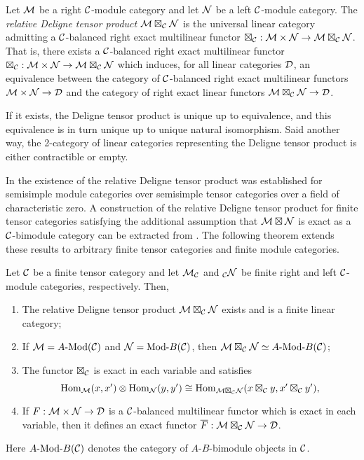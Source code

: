 \documentclass{amsart}
\begin{document}
\begin{definition}
	Let $\mathcal M$ be a right $\mathcal C$-module category and let $\mathcal N$ be a left $\mathcal C$-module category. The {\em relative Deligne tensor product $\mathcal M \boxtimes_{\mathcal C} \mathcal N$} is the universal linear category admitting a $\mathcal C$-balanced right exact multilinear functor $\boxtimes_{\mathcal C}: \mathcal M \times \mathcal N \to \mathcal M \boxtimes_{\mathcal C} \mathcal N$. That is, there exists a $\mathcal C$-balanced right exact multilinear functor $\boxtimes_{\mathcal C}: \mathcal M \times \mathcal N \to \mathcal M \boxtimes_{\mathcal C} \mathcal N$ which induces, for all linear categories $\mathcal D$, an equivalence between the category of $\mathcal C$-balanced right exact multilinear functors $\mathcal M \times \mathcal N \to \mathcal D$ and the category of right exact linear functors $\mathcal M \boxtimes_{\mathcal C} \mathcal N \to \mathcal D$. 
\end{definition}

If it exists, the Deligne tensor product is unique up to equivalence, and this equivalence is in turn unique up to unique natural isomorphism. Said another way, the 2-category of linear categories representing the Deligne tensor product is either contractible or empty. 

In \cite{0909.3140} the existence of the relative Deligne tensor product was established for semisimple module categories over semisimple tensor categories over a field of characteristic zero.  A construction of the relative Deligne tensor product for finite tensor categories satisfying the additional assumption that $\mathcal M \boxtimes \mathcal N$ is exact as a $\mathcal C$-bimodule category can be extracted from \cite[Thm 3.1]{1102.3411}. The following theorem extends these results to arbitrary finite tensor categories and finite module categories. 

\begin{theorem} \label{thm:DelignePrdtOverATCExists}
	Let $\mathcal C$ be a finite tensor category and let $\mathcal M_{\mathcal C}$ and ${}_{\mathcal C}\mathcal N$ be finite right and left $\mathcal C$-module categories, respectively. Then,
	\begin{enumerate}
		\item The relative Deligne tensor product $\mathcal M \boxtimes_{\mathcal C} \mathcal N$ exists and is a finite linear category;
		\item If $\cM = \Mod{A}{}(\cC)$ and $\cN = \Mod{}{B}(\cC)$, then $\cM \boxtimes_{\cC} \cN \simeq \Mod{A }{B}(\cC)$;

		\item The functor $\boxtimes_{\mathcal C}$ is exact in each variable and satisfies 
		\begin{equation*}
			\operatorname{Hom}_{\mathcal M}(x,x') \otimes \operatorname{Hom}_{\mathcal N}(y, y') \cong \operatorname{Hom}_{\mathcal M \boxtimes_{\mathcal C} \mathcal N} (x \boxtimes_{\mathcal C} y, x' \boxtimes_{\mathcal C} y'),
		\end{equation*}
		\item If $F: \mathcal M \times \mathcal N \to \mathcal D$ is a $\mathcal C$-balanced multilinear functor which is exact in each variable, then it defines an exact functor $\overline{F}: \mathcal M \boxtimes_{\mathcal C} \mathcal N \to \mathcal D$. 
	\end{enumerate} 
\nid Here $\Mod{A}{B}(\cC)$ denotes the category of $A$-$B$-bimodule objects in $\mathcal C$.	
\end{theorem}
\end{document}
